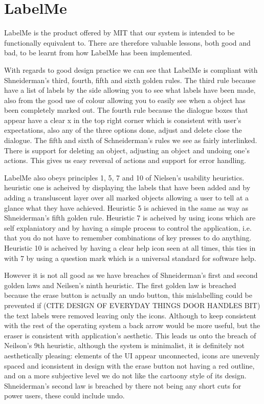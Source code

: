 \documentclass[a4paper,11pt,oneside]{article}
\begin{document}
\section{LabelMe}
LabelMe is the product offered by MIT that our system is intended to be
functionally equivalent to.  There are therefore valuable lessons, both good and
bad, to be learnt from how LabelMe has been implemented.

With regards to good design practice we can see that LabelMe is compliant with
Shneiderman's third, fourth, fifth and sixth golden rules.  The third rule
because have a list of labels by the side allowing you to see what labels have
been made, also from the good use of colour allowing you to easily see when a
object has been completely marked out.  The fourth rule because the dialogue
boxes that appear have a clear x in the top right corner which is consistent
with user's expectations, also any of the three options done, adjust and delete
close the dialogue.  The fifth and sixth of Schneiderman's rules we see as
fairly interlinked.  There is support for deleting an object, adjusting an
object and undoing one's actions.  This gives us easy reversal of actions and
support for error handling.

LabelMe also obeys principles 1, 5, 7 and 10 of Nielsen's usability heuristics. 
heuristic one is acheived by displaying the labels that have been added and by
adding a transluscent layer over all marked objects allowing a user to tell at a
glance what they have achieved.  Heuristic 5 is achieved in the same as way as
Shneiderman's fifth golden rule.  Heuristic 7 is acheived by using icons which
are self explaniatory and by having a simple process to control the application,
 i.e. that you do not have to remember combinations of key presses to do
anything. Heuristic 10 is acheived by having a clear help icon seen at all
times, this ties in with 7 by using a question mark which is a universal
standard for software help.

However it is not all good as we have breaches of Shneiderman's first and
second golden laws and Neilsen's ninth heuristic.  The first golden law is
breached because the erase button is actually an undo button, this mislabelling
could be prevented if (CITE DESIGN OF EVERYDAY THINGS DOOR HANDLES BIT) the text
labels were removed leaving only the icons.  Although to keep consistent with
the rest of the operating system a back arrow would be more useful, but the
eraser is consistent with application's aesthetic.  This leads us onto the
breach of Neilson's 9th heuristic, although the system is minimalist, it is
definitely not aesthetically pleasing: elements of the UI appear unconnected,
icons are unevenly spaced and iconsistent in design with the erase button not
having a red outline, and on a more subjective level we do not like the cartoony
style of its design.  Shneiderman's second law is breached by there not being
any short cuts for power users, these could include undo.
\end{document}
